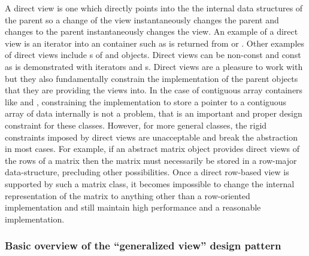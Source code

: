 \documentclass[pdf,ps2pdf,11pt]{SANDreport}
\begin{document}
A direct view is one which directly points into the the internal data
structures of the parent so a change of the view instantaneously
changes the parent and changes to the parent instantaneously changes
the view.  An example of a direct view is an iterator into an
container such as is returned from {} or
{}.  Other examples of direct views include
{}s of {} and {}
objects.  Direct views can be non-const and const as is demonstrated
with iterators and {}s.  Direct views are a pleasure
to work with but they also fundamentally constrain the implementation
of the parent objects that they are providing the views into.  In the
case of contiguous array containers like {} and
{}, constraining the implementation to store a
pointer to a contiguous array of data internally is not a problem,
that is an important and proper design constraint for these classes.
However, for more general classes, the rigid constraints imposed by
direct views are unacceptable and break the abstraction in most cases.
For example, if an abstract matrix object provides direct views of the
rows of a matrix then the matrix must necessarily be stored in a
row-major data-structure, precluding other possibilities.  Once a
direct row-based view is supported by such a matrix class, it becomes
impossible to change the internal representation of the matrix to
anything other than a row-oriented implementation and still maintain
high performance and a reasonable implementation.


%
{}\subsubsection*{Basic overview of the ``generalized view'' design
pattern}
%
\end{document}
